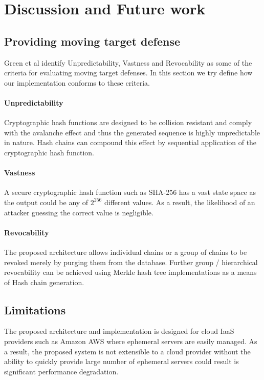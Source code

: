 \documentclass[a4paper,twoside]{article}
\begin{document}
\section{Discussion and Future work}
\label{sec:future}
\subsection{Providing moving target defense}

Green et al \cite{green_characterizing_2015} identify Unpredictability, Vastness and Revocability as some of the criteria for evaluating moving target defenses. In this section we try define how our implementation conforms to these criteria.

\paragraph*{Unpredictability} Cryptographic hash functions \cite{rogaway_cryptographic_2004} are designed to be collision resistant and comply with the avalanche effect and thus the generated sequence is highly unpredictable in nature. Hash chains can compound this effect by sequential application of the cryptographic hash function.

\paragraph*{Vastness} A secure cryptographic hash function such as SHA-256 has a vast state space as the output could be any of $2^{256}$ different values.  As a result, the likelihood of an attacker guessing the correct value is negligible.

\paragraph*{Revocability} The proposed architecture allows individual chains or a group of chains to be revoked merely by purging them from the database. Further group / hierarchical revocability can be achieved using Merkle hash tree implementations as a means of Hash chain generation.

\subsection{Limitations}
The proposed architecture and implementation is designed for cloud IaaS providers such as Amazon AWS where ephemeral servers are easily managed.  As a result, the proposed system is not extensible to a cloud provider without the ability to quickly provide large number of ephemeral servers  could result is significant performance degradation.
\end{document}
